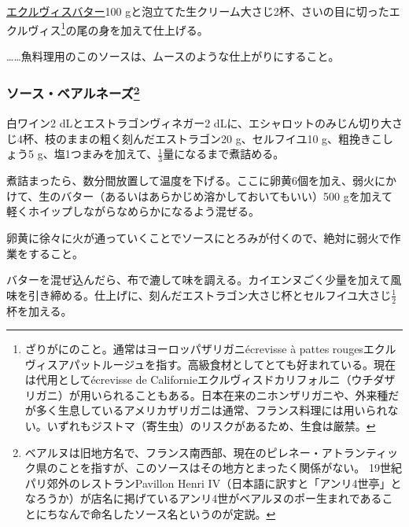\begin{recette}
\protect\hyperlink{beurre-d-ecrevisse}{エクルヴィスバター}100
gと泡立てた生クリーム大さじ2杯、さいの目に切ったエクルヴィス\footnote{ざりがにのこと。通常はヨーロッパザリガニécrevisse
  à pattes
  rougesエクルヴィスアパットルージュを指す。高級食材としてとても好まれている。現在は代用としてécrevisse
  de
  Californieエクルヴィスドカリフォルニ（ウチダザリガニ）が用いられることもある。日本在来のニホンザリガニや、外来種だが多く生息しているアメリカザリガニは通常、フランス料理には用いられない。いずれもジストマ（寄生虫）のリスクがあるため、生食は厳禁。}の尾の身を加えて仕上げる。

\ldots{}\ldots{}魚料理用のこのソースは、ムースのような仕上がりにすること。

\hypertarget{sauce-bearnaise}{%
\subsubsection[ソース・ベアルネーズ]{\texorpdfstring{ソース・ベアルネーズ\footnote{ベアルヌは旧地方名で、フランス南西部、現在のピレネー・アトランティック県のことを指すが、このソースはその地方とまったく関係がない。
  19世紀パリ郊外のレストランPavillon Henri
  IV（日本語に訳すと「アンリ4世亭」となろうか）が店名に掲げているアンリ4世がベアルヌのポー生まれであることにちなんで命名したソース名というのが定説。}}{ソース・ベアルネーズ}}\label{sauce-bearnaise}}



白ワイン2 dLとエストラゴンヴィネガー2
dLに、エシャロットのみじん切り大さじ4杯、枝のままの粗く刻んだエストラゴン20
g、セルフイユ10 g、粗挽きこしょう5
g、塩1つまみを加えて、\(\frac{1}{3}\)量になるまで煮詰める。

煮詰まったら、数分間放置して温度を下げる。ここに卵黄6個を加え、弱火にかけて、生のバター（あるいはあらかじめ溶かしておいてもいい）500
gを加えて軽くホイップしながらなめらかになるよう混ぜる。

卵黄に徐々に火が通っていくことでソースにとろみが付くので、絶対に弱火で作業をすること。

バターを混ぜ込んだら、布で漉して味を調える。カイエンヌごく少量を加えて風味を引き締める。仕上げに、刻んだエストラゴン大さじ杯とセルフイユ大さじ\(\frac{1}{2}\)杯を加える。


\end{recette}
